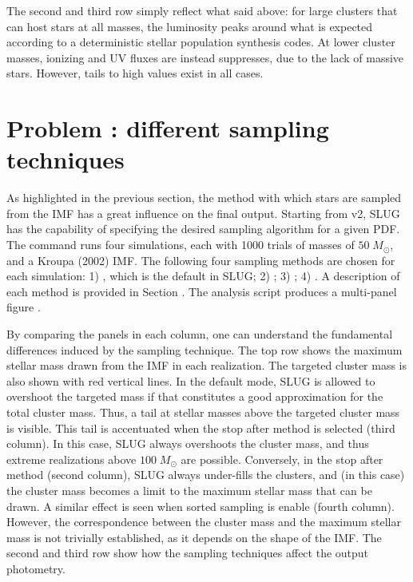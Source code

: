 \documentclass[letterpaper,10pt,english]{sphinxmanual}
\begin{document}
The second and third row simply reflect what said above: for large clusters that can host
stars at all masses, the luminosity peaks around what is expected according to a deterministic
stellar population synthesis codes. At lower cluster masses, ionizing and UV fluxes
are instead suppresses, due to the lack of massive stars. However, tails to high values exist
in all cases.


\section{Problem : different sampling techniques}
\label{\detokenize{tests:problem-sampling-different-sampling-techniques}}
As highlighted in the previous section, the method with which stars are sampled from the
IMF has a great influence on the final output. Starting from v2, SLUG has the capability of
specifying the desired sampling algorithm for a given PDF.
The command   runs four  simulations, each with 1000 trials
of masses of \(50\;M_\odot\), and a Kroupa (2002) IMF.
The following four sampling methods are chosen for each simulation: 1) ,
which is the default in SLUG; 2) ; 3) ; 4) .
A description of each method is provided in Section {\hyperref[\detokenize{pdfs:sampling-metod-label}]{}}.
The analysis script  produces a multi-panel
figure .

By comparing the panels in each column, one can understand the fundamental differences
induced by the sampling technique. The top row shows the maximum stellar mass drawn from the
IMF in each realization. The targeted cluster mass is also shown with red vertical lines.
In the default mode, SLUG is allowed to overshoot the targeted mass if that constitutes
a good approximation for the total cluster mass. Thus, a tail at stellar masses above the
targeted cluster mass is visible. This tail is accentuated when the stop after method
is selected (third column). In this case, SLUG always overshoots the cluster mass, and thus
extreme realizations above \(100\;M_\odot\)  are possible. Conversely, in the
stop after method (second column), SLUG always under-fills the clusters, and (in this case)
the cluster mass becomes a limit to the maximum stellar mass that can be drawn. A similar effect
is seen when sorted sampling is enable (fourth column). However, the correspondence between the
cluster mass and the maximum stellar mass is not trivially established, as it depends on the
shape of the IMF. The second and third row show how the sampling techniques affect the output
photometry.
\end{document}
